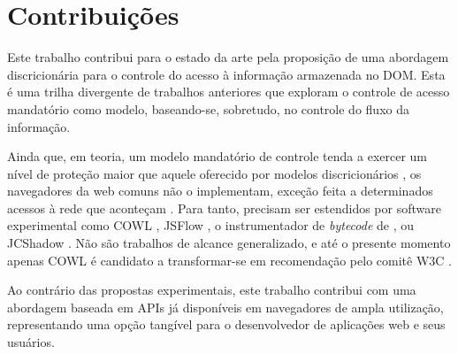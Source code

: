 \section{Contribuições}

Este trabalho contribui para o estado da arte pela proposição de uma abordagem discricionária para o controle do acesso à informação armazenada no DOM. Esta é uma trilha divergente de trabalhos anteriores que exploram o controle de acesso mandatório como modelo, baseando-se, sobretudo, no controle do fluxo da informação.

Ainda que, em teoria, um modelo mandatório de controle tenda a exercer um nível de proteção maior que aquele oferecido por modelos discricionários \cite[p. 46]{CNSS2015} \cite[p. 4]{Foster1998}, os navegadores da web comuns não o implementam, exceção feita a determinados acessos à rede que aconteçam . Para tanto, precisam ser estendidos por software experimental como COWL \cite{Stefan2014}, JSFlow \cite{Hedin2016}, o instrumentador de \textit{bytecode} de \cite{Bichhawat2014}, ou JCShadow \cite{Patil2011}. Não são trabalhos de alcance generalizado, e até o presente momento apenas COWL é candidato a transformar-se em recomendação pelo comitê W3C \cite{W3C:COWL}.

Ao contrário das propostas experimentais, este trabalho contribui com uma abordagem baseada em APIs já disponíveis em navegadores de ampla utilização, representando uma opção tangível para o desenvolvedor de aplicações web e seus usuários.

